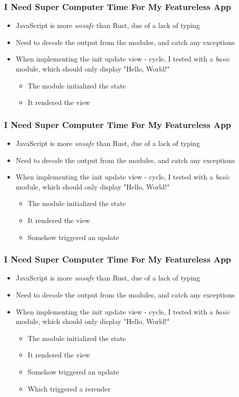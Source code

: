 \begin{frame}
  \frametitle{I Need Super Computer Time For My Featureless App}
  \begin{itemize}
    \item JavaScript is more \textit{unsafe} than Rust, due of a lack of typing
    \item Need to decode the output from the modules, and catch any exceptions
    \item When implementing the init \to update \to view - cycle, I tested with
      a \textit{basic} module, which should only display "Hello, World!"
      \begin{itemize}
        \item The module initialized the state
        \item It rendered the view
      \end{itemize}
  \end{itemize}
\end{frame}

\begin{frame}
  \frametitle{I Need Super Computer Time For My Featureless App}
  \begin{itemize}
    \item JavaScript is more \textit{unsafe} than Rust, due of a lack of typing
    \item Need to decode the output from the modules, and catch any exceptions
    \item When implementing the init \to update \to view - cycle, I tested with
      a \textit{basic} module, which should only display "Hello, World!"
      \begin{itemize}
        \item The module initialized the state
        \item It rendered the view
        \item Somehow triggered an update
      \end{itemize}
  \end{itemize}
\end{frame}

\begin{frame}
  \frametitle{I Need Super Computer Time For My Featureless App}
  \begin{itemize}
    \item JavaScript is more \textit{unsafe} than Rust, due of a lack of typing
    \item Need to decode the output from the modules, and catch any exceptions
    \item When implementing the init \to update \to view - cycle, I tested with
      a \textit{basic} module, which should only display "Hello, World!"
      \begin{itemize}
        \item The module initialized the state
        \item It rendered the view
        \item Somehow triggered an update
        \item Which triggered a rerender
      \end{itemize}
  \end{itemize}
\end{frame}

